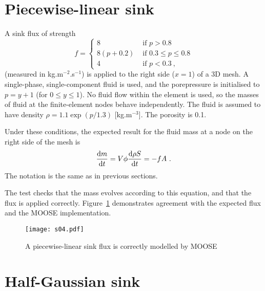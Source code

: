 \section{Piecewise-linear sink}
\label{piecewise.sec}

A sink flux of strength
\begin{equation}
f = \left\{
\begin{array}{ll}
8 & \mbox{ if } p > 0.8 \\
8(p + 0.2) & \mbox{ if } 0.3 \leq p \leq 0.8 \\
4 & \mbox{ if } p < 0.3 \ ,
\end{array}
\right.
\end{equation}
(measured in kg.m$^{-2}$.s$^{-1}$) is applied to the right side
($x=1$) of a 3D mesh.  A single-phase, single-component fluid is used,
and the porepressure is initialised to $p=y+1$ (for $0\leq y \leq 1$).
No fluid flow within the element is used, so the masses of fluid at
the finite-element nodes behave independently.  The fluid is assumed
to have density $\rho = 1.1 \exp(p/1.3)$ [kg.m$^{-3}$].  The porosity
is 0.1.

Under these conditions, the expected result for the fluid mass at a
node on the right side of the mesh is
\begin{equation}
\frac{\mathrm{d} m}{\mathrm{d} t} = V\phi \frac{\mathrm{d} \rho S}{\mathrm{d} t} = -f A \ .
\end{equation}
The notation is the same as in previous sections.

The test checks that the mass evolves according to this equation, and
that the flux is applied correctly.  Figure~\ref{s04.fig} demonstrates
agreement with the expected flux and the MOOSE implementation.

\begin{figure}[htb]
\begin{center}
\texttt{[image: s04.pdf]}
\caption{A piecewise-linear sink flux is correctly modelled by MOOSE}
\label{s04.fig}
\end{center}
\end{figure}



\section{Half-Gaussian sink}
\label{half_gaussian.sec}

